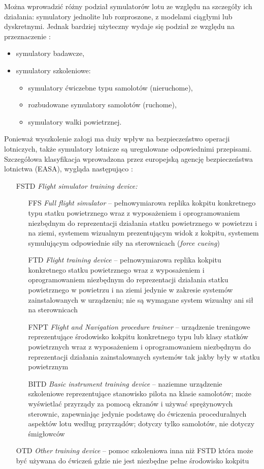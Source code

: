 Można wprowadzić różny podział symulatorów lotu ze względu na szczegóły ich działania: symulatory jednolite lub rozproszone, z modelami ciągłymi lub dyskretnymi. Jednak bardziej użyteczny wydaje się podział ze względu na przeznaczenie \cite{szczepanski1990}:
\begin{itemize}
  \item symulatory badawcze,
  \item symulatory szkoleniowe:
  \begin{itemize}
    \item symulatory ćwiczebne typu samolotów (nieruchome),
    \item rozbudowane symulatory samolotów (ruchome),
    \item symulatory walki powietrznej.
  \end{itemize}
\end{itemize}

Ponieważ wyszkolenie załogi ma duży wpływ na bezpieczeństwo operacji lotniczych, także symulatory lotnicze są uregulowane odpowiednimi przepisami. Szczegółowa klasyfikacja wprowadzona przez europejską agencję bezpieczeństwa lotnictwa (EASA), wygląda następująco \cite{cs-fstd}:
\begin{itemize}
  \item[FSTD] \emph{Flight simulator training device:}
  \begin{itemize}
    \item[FFS] \emph{Full flight simulator} -- pełnowymiarowa replika kokpitu konkretnego typu statku powietrznego wraz z wyposażeniem i oprogramowaniem niezbędnym do reprezentacji działania statku powietrznego w powietrzu i na ziemi, systemem wizualnym prezentującym widok z kokpitu, systemem symulującym odpowiednie siły na sterownicach (\emph{force cueing})
    \item[FTD] \emph{Flight training device} -- pełnowymiarowa replika kokpitu konkretnego statku powietrznego wraz z wyposażeniem i oprogramowaniem niezbędnym do reprezentacji działania statku powietrznego w powietrzu i na ziemi jedynie w zakresie systemów zainstalowanych w urządzeniu; nie są wymagane system wizualny ani sił na sterownicach
    \item[FNPT] \emph{Flight and Navigation procedure trainer} -- urządzenie treningowe reprezentujące środowisko kokpitu konkretnego typu lub klasy statków powietrznych wraz z wyposażeniem i oprogramowaniem niezbędnym do reprezentacji działania zainstalowanych systemów tak jakby były w statku powietrznym
    \item[BITD] \emph{Basic instrument training device} -- naziemne urządzenie szkoleniowe reprezentujące stanowisko pilota na klasie samolotów; może wyświetlać przyrządy za pomocą ekranów i używać sprężynowych sterownic, zapewniając jedynie podstawę do ćwiczenia proceduralnych aspektów lotu według przyrządów; dotyczy tylko samolotów, nie dotyczy śmigłowców
  \end{itemize} 
  \item[OTD] \emph{Other training device} -- pomoc szkoleniowa inna niż FSTD która może być używana do ćwiczeń gdzie nie jest niezbędne pełne środowisko kokpitu
\end{itemize}

